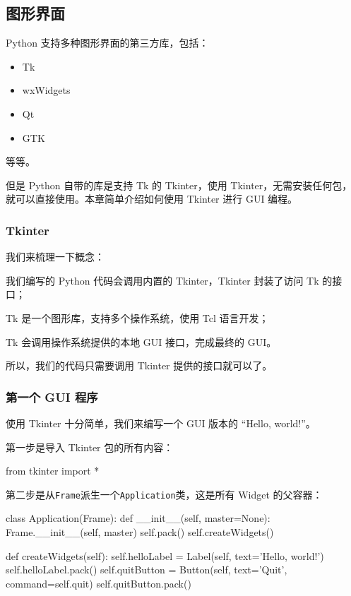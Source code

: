 \hypertarget{ux56feux5f62ux754cux9762}{%
\subsection{图形界面}\label{ux56feux5f62ux754cux9762}}

Python 支持多种图形界面的第三方库，包括：

\begin{itemize}
\item
  Tk
\item
  wxWidgets
\item
  Qt
\item
  GTK
\end{itemize}

等等。

但是 Python 自带的库是支持 Tk 的 Tkinter，使用
Tkinter，无需安装任何包，就可以直接使用。本章简单介绍如何使用 Tkinter
进行 GUI 编程。

\hypertarget{tkinter}{%
\subsubsection{Tkinter}\label{tkinter}}

我们来梳理一下概念：

我们编写的 Python 代码会调用内置的 Tkinter，Tkinter 封装了访问 Tk
的接口；

Tk 是一个图形库，支持多个操作系统，使用 Tcl 语言开发；

Tk 会调用操作系统提供的本地 GUI 接口，完成最终的 GUI。

所以，我们的代码只需要调用 Tkinter 提供的接口就可以了。

\hypertarget{ux7b2cux4e00ux4e2a-gui-ux7a0bux5e8f}{%
\subsubsection{第一个 GUI
程序}\label{ux7b2cux4e00ux4e2a-gui-ux7a0bux5e8f}}

使用 Tkinter 十分简单，我们来编写一个 GUI 版本的 ``Hello, world!''。

第一步是导入 Tkinter 包的所有内容：

\begin{pythoncode}
from tkinter import *
\end{pythoncode}

第二步是从\texttt{Frame}派生一个\texttt{Application}类，这是所有 Widget
的父容器：

\begin{pythoncode}
class Application(Frame):
    def __init__(self, master=None):
        Frame.__init__(self, master)
        self.pack()
        self.createWidgets()

    def createWidgets(self):
        self.helloLabel = Label(self, text='Hello, world!')
        self.helloLabel.pack()
        self.quitButton = Button(self, text='Quit', command=self.quit)
        self.quitButton.pack()
\end{pythoncode}

